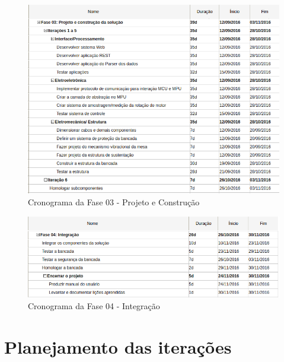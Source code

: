 \begin{figure}[!ht]
\centering
\includegraphics[scale=0.9]{figuras/cronograma_fase03.png}
\caption{Cronograma da Fase 03 - Projeto e Construção}
\end{figure}

\begin{figure}[!ht]
\centering
\includegraphics[scale=0.9]{figuras/cronograma_fase04.png}
\caption{Cronograma da Fase 04 - Integração}
\end{figure}

\section{Planejamento das iterações}

